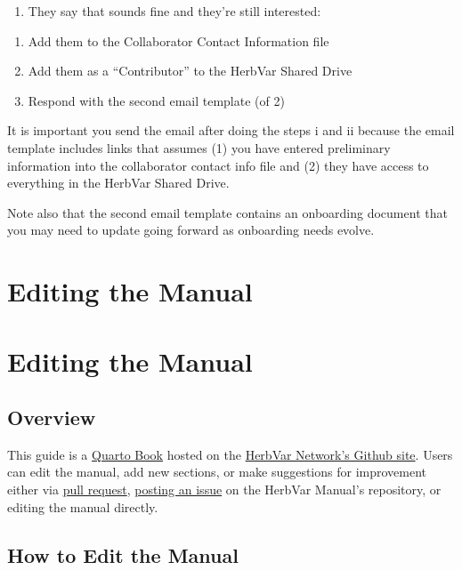 \documentclass[
  letterpaper,
  DIV=11,
  numbers=noendperiod]{scrreprt}
\providecommand{\tightlist}{%
  \setlength{\itemsep}{0pt}\setlength{\parskip}{0pt}}\usepackage{longtable,booktabs,array}
\begin{document}
\begin{enumerate}
\def\labelenumi{\alph{enumi})}
\setcounter{enumi}{1}
\tightlist
\item
  They say that sounds fine and they're still interested:
\end{enumerate}

\begin{enumerate}
\def\labelenumi{\roman{enumi}.}
\item
  Add them to the Collaborator Contact Information file
\item
  Add them as a ``Contributor'' to the HerbVar Shared Drive
\item
  Respond with the second email template (of 2)
\end{enumerate}

It is important you send the email after doing the steps i and ii
because the email template includes links that assumes (1) you have
entered preliminary information into the collaborator contact info file
and (2) they have access to everything in the HerbVar Shared Drive.

Note also that the second email template contains an onboarding document
that you may need to update going forward as onboarding needs evolve.

\chapter{Editing the Manual}\label{editing-the-manual}

\chapter{Editing the Manual}\label{editing-the-manual-1}

\section{Overview}\label{overview-5}

This guide is a \href{https://quarto.org/docs/books}{Quarto Book} hosted
on the \href{https://github.com/HerbVar-Network}{HerbVar Network's
Github site}. Users can edit the manual, add new sections, or make
suggestions for improvement either via
\href{https://github.com/HerbVar-Network/project_manual/pulls}{pull
request},
\href{https://github.com/HerbVar-Network/project_manual/issues}{posting
an issue} on the HerbVar Manual's repository, or editing the manual
directly.

\section{How to Edit the Manual}\label{how-to-edit-the-manual}
\end{document}
